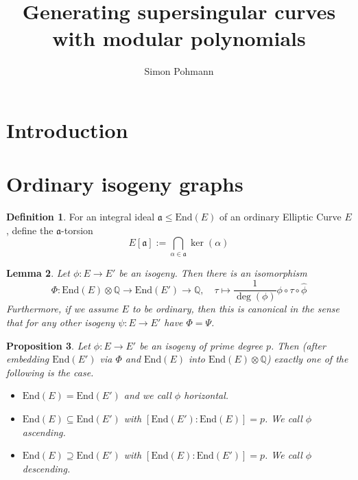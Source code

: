 \documentclass{scrartcl}
\title{Generating supersingular curves with modular polynomials}
\author{Simon Pohmann}
\newcommand{\Q}{\mathbb{Q}}
\newcommand{\End}{\mathrm{End}}
\renewcommand{\a}{\mathfrak{a}}
\newtheorem{prop}{Proposition}[section]
\newtheorem{lemma}[prop]{Lemma}
\theoremstyle{definition}
\newtheorem{definition}[prop]{Definition}
\begin{document}
\maketitle

\section{Introduction}

\section{Ordinary isogeny graphs}

\begin{definition}
    For an integral ideal $\a \leq \End(E)$ of an ordinary Elliptic Curve $E$, define the $\a$-torsion
    \begin{equation*}
        E[\a] := \bigcap_{\alpha \in \a} \ker(\alpha)
    \end{equation*}
\end{definition}
\begin{lemma}
    Let $\phi: E \to E'$ be an isogeny.
    Then there is an isomorphism
    \begin{equation*}
        \Phi: \End(E) \otimes \Q \to \End(E') \to \Q, \quad \tau \mapsto \frac 1 {\deg(\phi)} \phi \circ \tau \circ \hat{\phi}
    \end{equation*}
    Furthermore, if we assume $E$ to be ordinary, then this is canonical in the sense that for any other isogeny $\psi: E \to E'$ have $\Phi = \Psi$.
\end{lemma}
\begin{prop}
    Let $\phi: E \to E'$ be an isogeny of prime degree $p$.
    Then (after embedding $\End(E')$ via $\Phi$ and $\End(E)$ into $\End(E) \otimes \Q$) exactly one of the following is the case.
    \begin{itemize}
        \item $\End(E) = \End(E')$ and we call $\phi$ \emph{horizontal}.
        \item $\End(E) \subseteq \End(E')$ with $[\End(E') : \End(E)] = p$. We call $\phi$ \emph{ascending}.
        \item $\End(E) \supseteq \End(E')$ with $[\End(E) : \End(E')] = p$. We call $\phi$ \emph{descending}.
    \end{itemize}
\end{prop}
\end{document}
